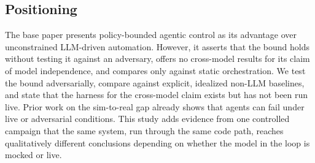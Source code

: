 \subsection{Positioning}
The base paper presents policy-bounded agentic control as its advantage over unconstrained LLM-driven
automation. However, it asserts that the bound holds without testing it against an adversary, offers
no cross-model results for its claim of model independence, and compares only against static
orchestration. We test the bound adversarially, compare against explicit, idealized non-LLM
baselines, and state that the harness for the cross-model claim exists but has not been run live.
Prior work on the sim-to-real gap already shows that agents can fail under live or adversarial
conditions. This study adds evidence from one controlled campaign that the same system, run
through the same code path, reaches qualitatively different conclusions depending on whether the model
in the loop is mocked or live.
